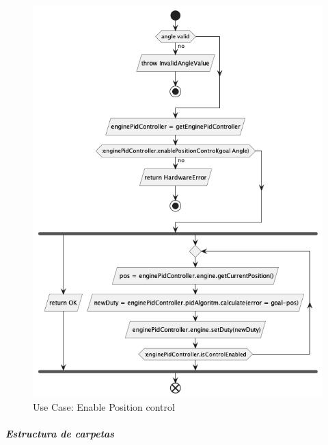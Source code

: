 \begin{itemize}
    \begin{figure}[H]
        \centering
        \includegraphics[height=0.4\textheight]{./part/Proyecto_ejecutivo/memoria_descriptiva/descripcionDelProyecto/control/uml/enablePositionControl}
        \caption{Use Case: Enable Position control}\label{fig:Use Case- Enable Position control}
    \end{figure}
\end{itemize}

\subparagraph{Estructura de carpetas}







